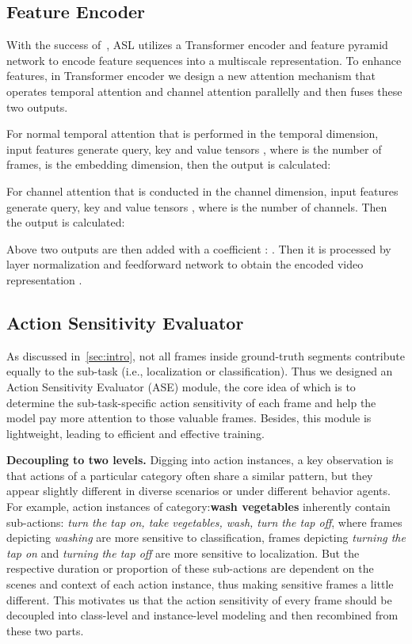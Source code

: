 \documentclass[10pt,twocolumn,letterpaper]{article}
\begin{document}
\subsection{Feature Encoder}
\par With the success of~\cite{zhang2022actionformer,afsd}, ASL utilizes a Transformer encoder and feature pyramid network to encode feature sequences into a multiscale representation. To enhance features, in Transformer encoder we design a new attention mechanism that operates temporal attention and channel attention parallelly and then fuses these two outputs.
\par For normal temporal attention that is performed in the temporal dimension, input features generate query, key and value tensors , where  is the number of frames,  is the embedding dimension, then the output is calculated: 

\par For channel attention that is conducted in the channel dimension, input features generate query, key and value tensors , where  is the number of channels. Then the output is calculated:

\par Above two outputs are then added with a coefficient : . Then it is processed by layer normalization and feedforward network to obtain the encoded video representation .

\subsection{Action Sensitivity Evaluator}
\par As discussed in~\ref{sec:intro}, not all frames inside ground-truth segments contribute equally to the sub-task (i.e., localization or classification). Thus we designed an Action Sensitivity Evaluator (ASE) module, the core idea of which is to determine the sub-task-specific action sensitivity of each frame and help the model pay more attention to those valuable frames. Besides, this module is lightweight, leading to efficient and effective training.
\par \textbf{Decoupling to two levels.} Digging into action instances, a key observation is that actions of a particular category often share a similar pattern, but they appear slightly different in diverse scenarios or under different behavior agents. For example,  action instances of category:\textbf{wash vegetables} inherently contain sub-actions: \textit{turn the tap on, take vegetables, wash, turn the tap off},  where frames depicting \textit{washing} are more sensitive to classification,  frames depicting \textit{turning the tap on} and \textit{turning the tap off} are more sensitive to localization. But the respective duration or proportion of these sub-actions are dependent on the scenes and context of each action instance, thus making sensitive frames a little different. This motivates us that the action sensitivity of every frame should be decoupled into class-level and instance-level modeling and then recombined from these two parts. 
\end{document}
